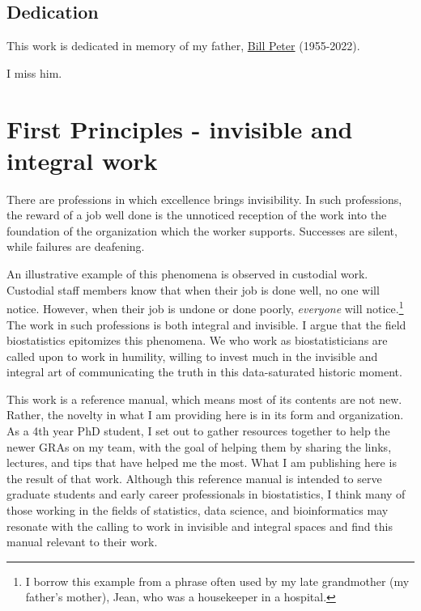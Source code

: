 \documentclass[
]{book}
\begin{document}
\hypertarget{dedication}{%
\section{Dedication}\label{dedication}}

This work is dedicated in memory of my father, \href{https://www.hendersonvillefh.com/obituary/William-Peter}{Bill Peter} (1955-2022).

I miss him.

\hypertarget{first-principles---invisible-and-integral-work}{%
\chapter{First Principles - invisible and integral work}\label{first-principles---invisible-and-integral-work}}

There are professions in which excellence brings invisibility. In such professions, the reward of a job well done is the unnoticed reception of the work into the foundation of the organization which the worker supports. Successes are silent, while failures are deafening.

An illustrative example of this phenomena is observed in custodial work. Custodial staff members know that when their job is done well, no one will notice. However, when their job is undone or done poorly, \emph{everyone} will notice.\footnote{I borrow this example from a phrase often used by my late grandmother (my father's mother), Jean, who was a housekeeper in a hospital.} The work in such professions is both integral and invisible. I argue that the field biostatistics epitomizes this phenomena. We who work as biostatisticians are called upon to work in humility, willing to invest much in the invisible and integral art of communicating the truth in this data-saturated historic moment.

This work is a reference manual, which means most of its contents are not new. Rather, the novelty in what I am providing here is in its form and organization. As a 4th year PhD student, I set out to gather resources together to help the newer GRAs on my team, with the goal of helping them by sharing the links, lectures, and tips that have helped me the most. What I am publishing here is the result of that work. Although this reference manual is intended to serve graduate students and early career professionals in biostatistics, I think many of those working in the fields of statistics, data science, and bioinformatics may resonate with the calling to work in invisible and integral spaces and find this manual relevant to their work.
\end{document}
